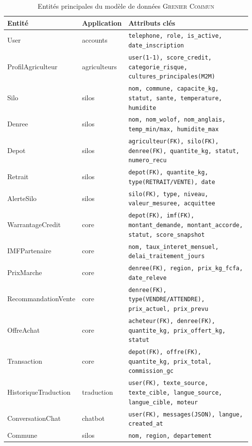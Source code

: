 \documentclass[12pt,a4paper,twoside]{report}
\newcommand{\gc}{\textsc{Grenier Commun}}
\begin{document}
\begin{table}[H]
\centering
\caption{Entités principales du modèle de données \gc{}}
\label{tab:entites}
\begin{tabular}{L{3cm}L{2.5cm}L{8cm}}
\toprule
\textbf{Entité} & \textbf{Application} & \textbf{Attributs clés} \\
\midrule
User            & accounts     & \texttt{telephone, role, is\_active, date\_inscription} \\
ProfilAgriculteur & agriculteurs & \texttt{user(1-1), score\_credit, categorie\_risque, cultures\_principales(M2M)} \\
Silo            & silos        & \texttt{nom, commune, capacite\_kg, statut, sante, temperature, humidite} \\
Denree          & silos        & \texttt{nom, nom\_wolof, nom\_anglais, temp\_min/max, humidite\_max} \\
Depot           & silos        & \texttt{agriculteur(FK), silo(FK), denree(FK), quantite\_kg, statut, numero\_recu} \\
Retrait         & silos        & \texttt{depot(FK), quantite\_kg, type(RETRAIT/VENTE), date} \\
AlerteSilo      & silos        & \texttt{silo(FK), type, niveau, valeur\_mesuree, acquittee} \\
WarrantageCredit & core        & \texttt{depot(FK), imf(FK), montant\_demande, montant\_accorde, statut, score\_snapshot} \\
IMFPartenaire   & core         & \texttt{nom, taux\_interet\_mensuel, delai\_traitement\_jours} \\
PrixMarche      & core         & \texttt{denree(FK), region, prix\_kg\_fcfa, date\_releve} \\
RecommandationVente & core     & \texttt{denree(FK), type(VENDRE/ATTENDRE), prix\_actuel, prix\_prevu} \\
OffreAchat      & core         & \texttt{acheteur(FK), denree(FK), quantite\_kg, prix\_offert\_kg, statut} \\
Transaction     & core         & \texttt{depot(FK), offre(FK), quantite\_kg, prix\_total, commission\_gc} \\
HistoriqueTraduction & traduction & \texttt{user(FK), texte\_source, texte\_cible, langue\_source, langue\_cible, moteur} \\
ConversationChat & chatbot     & \texttt{user(FK), messages(JSON), langue, created\_at} \\
Commune         & silos        & \texttt{nom, region, departement} \\
\bottomrule
\end{tabular}
\end{table}
\end{document}
